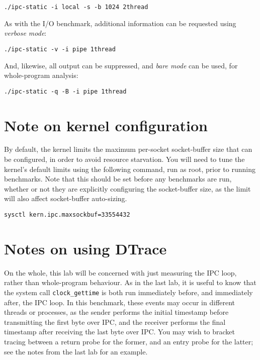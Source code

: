 \documentclass[a4paper,10pt]{article}
\begin{document}
\begin{verbatim}
./ipc-static -i local -s -b 1024 2thread
\end{verbatim}

\noindent
As with the I/O benchmark, additional information can be requested using
\textit{verbose mode}:

\begin{verbatim}
./ipc-static -v -i pipe 1thread
\end{verbatim}

\noindent
And, likewise, all output can be suppressed, and \textit{bare mode} can be
used, for whole-program analysis:

\begin{verbatim}
./ipc-static -q -B -i pipe 1thread
\end{verbatim}

\section*{Note on kernel configuration}

By default, the kernel limits the maximum per-socket socket-buffer size that
can be configured, in order to avoid resource starvation.
You will need to tune the kernel's default limits using the following command,
run as root, prior to running benchmarks.
Note that this should be set before any benchmarks are run, whether or not
they are explicitly configuring the socket-buffer size, as the limit will also
affect socket-buffer auto-sizing.

\begin{verbatim}
sysctl kern.ipc.maxsockbuf=33554432
\end{verbatim}

\section*{Notes on using DTrace}

On the whole, this lab will be concerned with just measuring the IPC loop,
rather than whole-program behaviour.
As in the last lab, it is useful to know that the system call
\texttt{clock\_gettime} is both run immediately before, and immediately after,
the IPC loop.
In this benchmark, these events may occur in different threads or processes,
as the sender performs the initial timestamp before transmitting the first
byte over IPC, and the receiver performs the final timestamp after receiving
the last byte over IPC.
You may wish to bracket tracing between a return probe for the former, and an
entry probe for the latter; see the notes from the last lab for an example.
\end{document}
